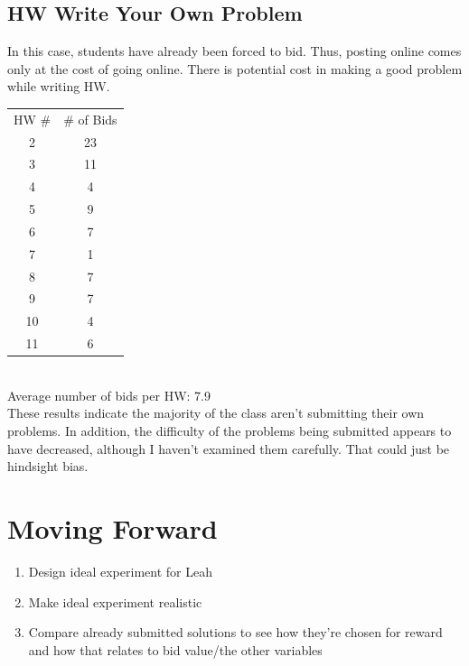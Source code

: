 \documentclass[leqno]{article}
\begin{document}
\subsection{HW Write Your Own Problem}
In this case, students have already been forced to bid. Thus, posting online comes only at the cost of going online. There is potential cost in making a good problem while writing HW.\\

\begin{tabular}{c c}
HW \# & \# of Bids\\
2 & 23\\
3 & 11\\
4 & 4\\
5 & 9\\
6 & 7\\
7 & 1\\
8 & 7\\
9 & 7\\
10 & 4\\
11 & 6
\end{tabular}\\

Average number of bids per HW: 7.9\\

These results indicate the majority of the class aren't submitting their own problems. In addition, the difficulty of the problems being submitted appears to have decreased, although I haven't examined them carefully. That could just be hindsight bias.

\section{Moving Forward}
\begin{enumerate}
\item Design ideal experiment for Leah
\item Make ideal experiment realistic
\item Compare already submitted solutions to see how they're chosen for reward and how that relates to bid value/the other variables
\end{enumerate}
\end{document}
